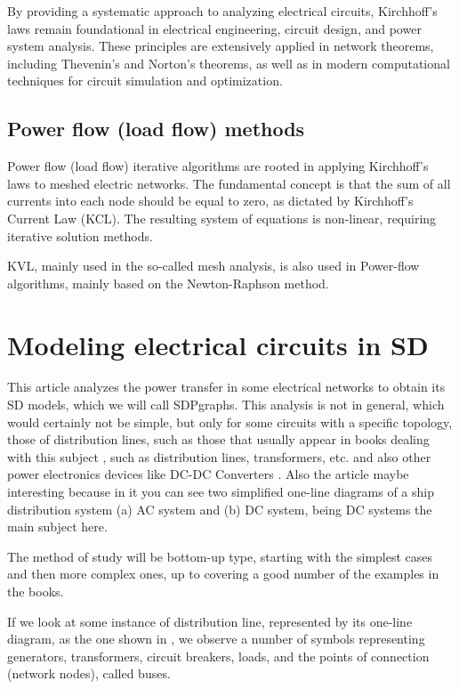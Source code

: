 \documentclass[11pt, a4paper]{article}
\theoremstyle{definition}
\theoremstyle{plain}
\theoremstyle{plain}
\theoremstyle{remark}
\theoremstyle{remark}
\theoremstyle{remark}
\begin{document}
By providing a systematic approach to analyzing electrical circuits, Kirchhoff’s laws remain foundational in electrical engineering, circuit design, and power system analysis. These principles are extensively applied in network theorems, including Thevenin’s and Norton’s theorems, as well as in modern computational techniques for circuit simulation and optimization.

\subsection{Power flow (load flow) methods}

Power flow (load flow) iterative algorithms are rooted in applying Kirchhoff’s laws to meshed electric networks. The fundamental concept is that the sum of all currents into each node should be equal to zero, as dictated by Kirchhoff’s Current Law (KCL). The resulting system of equations is non-linear, requiring iterative solution methods.

KVL, mainly used in the so-called mesh analysis, is also used in Power-flow algorithms, mainly based on the Newton-Raphson method. 


\section{Modeling electrical circuits in SD}

This article analyzes the power transfer in some electrical networks to obtain its SD models, which we will call SDPgraphs. This analysis is not in general, which would certainly not be simple, but only for some circuits with a specific topology, those of distribution lines, such as those that usually appear in books dealing with this subject \cite{Bergen2000}, such as distribution lines, transformers, etc. and also other power electronics devices like DC-DC Converters \cite{Rodriguez2015}. Also the article 
\cite[p.11]{Kurniawan2023} maybe interesting because in it you can see two simplified one-line diagrams of a ship distribution system (a) AC system and (b) DC system, being DC systems the main subject here.

The method of study will be bottom-up type, starting with the simplest cases and then more complex ones, up to covering a good number of the examples in the books.

If we look at some instance of distribution line, represented by its one-line diagram, as the one shown in \cite[p.13]{Bergen2000}, we observe a number of symbols representing generators, transformers, circuit breakers, loads, and the points of connection (network nodes), called buses.
\end{document}
